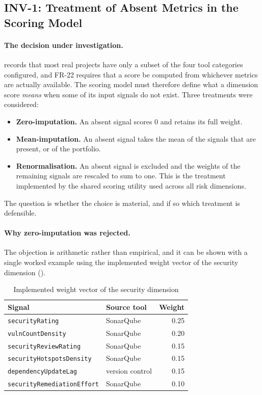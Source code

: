 \subsection{INV-1: Treatment of Absent Metrics in the Scoring Model}
\label{subsec:inv1}

\paragraph{The decision under investigation.}  records
that most real projects have only a subset of the four tool categories
configured, and FR-22 requires that a score be computed from whichever metrics
are actually available. The scoring model must therefore define what a dimension
score \emph{means} when some of its input signals do not exist. Three treatments
were considered:

\begin{itemize}
  \item \textbf{Zero-imputation.} An absent signal scores 0 and retains its full
  weight.
  \item \textbf{Mean-imputation.} An absent signal takes the mean of the signals
  that are present, or of the portfolio.
  \item \textbf{Renormalisation.} An absent signal is excluded and the weights of
  the remaining signals are rescaled to sum to one. This is the treatment
  implemented by the shared scoring utility used across all risk dimensions.
\end{itemize}

The question is whether the choice is material, and if so which treatment is
defensible.

\paragraph{Why zero-imputation was rejected.} The objection is arithmetic rather
than empirical, and it can be shown with a single worked example using the
implemented weight vector of the security dimension
().

\begin{table}[H]
\centering
\caption{Implemented weight vector of the security dimension}
\label{tab:security-weights}
\begin{tabular}{llr}
\toprule
\textbf{Signal} & \textbf{Source tool} & \textbf{Weight} \\
\midrule
\texttt{securityRating} & SonarQube & 0.25 \\
\texttt{vulnCountDensity} & SonarQube & 0.20 \\
\texttt{securityReviewRating} & SonarQube & 0.15 \\
\texttt{securityHotspotsDensity} & SonarQube & 0.15 \\
\texttt{dependencyUpdateLag} & version control & 0.15 \\
\texttt{securityRemediationEffort} & SonarQube & 0.10 \\
\bottomrule
\end{tabular}
\end{table}

